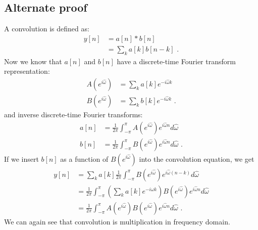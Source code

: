     \subsection*{Alternate proof}

    A convolution is defined as:
    \begin{align}
        y[n] & = a[n] * b[n]             \\
             & = \sum_k a[k] b[n-k]\,\,.
    \end{align}
    Now we know that $a[n]$ and $b[n]$ have a discrete-time Fourier transform representation:
    \begin{align}
        A(e^{i\hat{\omega}}) & = \sum_k a[k] e^{-i\hat{\omega}k}      \\
        B(e^{i\hat{\omega}}) & = \sum_k b[k] e^{-i\hat{\omega}k}\,\,.
    \end{align}
    and inverse discrete-time Fourier transforms:
    \begin{align}
        a[n] & = \frac{1}{2\pi}\int_{-\pi}^{\pi}A(e^{i\hat{\omega}})e^{i\hat{\omega}n}d\hat{\omega}      \\
        b[n] & = \frac{1}{2\pi}\int_{-\pi}^{\pi}B(e^{i\hat{\omega}})e^{i\hat{\omega}n}d\hat{\omega}\,\,.
    \end{align}
    If we insert $b[n]$ as a function of $B(e^{i\hat{\omega}})$ into the convolution equation, we get
    \begin{align}
        y[n] & = \sum_k a[k]\frac{1}{2\pi}\int_{-\pi}^{\pi}B(e^{i\hat{\omega}})e^{i\hat{\omega}(n-k)}d\hat{\omega}                               \\
             & = \frac{1}{2\pi}\int_{-\pi}^{\pi}\left(\sum_k a[k] e^{-i\hat{\omega}k} \right)B(e^{i\hat{\omega}})e^{i\hat{\omega}n}d\hat{\omega} \\
             & = \frac{1}{2\pi}\int_{-\pi}^{\pi}A(e^{i\hat{\omega}})B(e^{i\hat{\omega}})e^{i\hat{\omega}n}d\hat{\omega}\,\,.
    \end{align}
    We can again see that convolution is multiplication in frequency domain.
\fi


